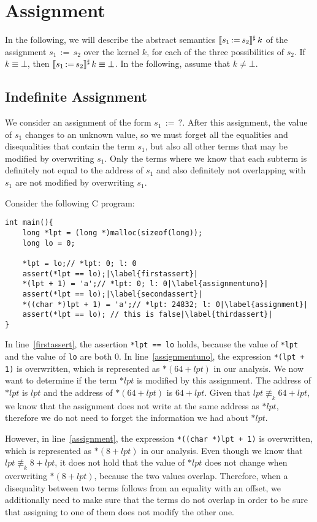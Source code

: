 \section{Assignment}

In the following, we will describe the abstract semantics $\llbracket s_1\,{:=}\,s_2\rrbracket^\sharp\,k$ of the assignment $s_1\,{:=}\,s_2$ over the kernel $k$, for each of the three possibilities of $s_2$.
If $k \equiv \bot$, then $\llbracket s_1\,{:=}\,s_2\rrbracket^\sharp\,k \equiv \bot$.
In the following, assume that $k \neq \bot$.

\subsection{Indefinite Assignment}

We consider an assignment of the form $s_1\,{:=}\,?$.
After this assignment, the value of $s_1$ changes to an unknown value,
so we must forget all the equalities and disequalities that contain the term $s_1$,
but also all other terms that may be modified by overwriting $s_1$.
Only the terms where we know that each subterm is definitely not equal to the address of $s_1$ and also definitely not overlapping with $s_1$ are not modified by overwriting $s_1$.

\begin{example}
	Consider the following C program:
\begin{verbatim}
int main(){
	long *lpt = (long *)malloc(sizeof(long));
	long lo = 0;

	*lpt = lo;// *lpt: 0; l: 0
	assert(*lpt == lo);|\label{firstassert}|
	*(lpt + 1) = 'a';// *lpt: 0; l: 0|\label{assignmentuno}|
	assert(*lpt == lo);|\label{secondassert}|
	*((char *)lpt + 1) = 'a';// *lpt: 24832; l: 0|\label{assignment}|
	assert(*lpt == lo); // this is false|\label{thirdassert}|
}
\end{verbatim}
In line~\ref{firstassert}, the assertion \texttt{*lpt == lo} holds, because the value of \texttt{*lpt} and the value of \texttt{lo} are both 0.
In line~\ref{assignmentuno}, the expression \texttt{*(lpt + 1)} is overwritten, which is represented as $*(64 + lpt)$ in our analysis.
We now want to determine if the term $*lpt$ is modified by this assignment.
The address of $*lpt$ is $lpt$ and the address of $*(64 + lpt)$ is $64 + lpt$.
Given that $lpt \nequiv_{k} 64 + lpt$, we know that the assignment does not write at the same address as $*lpt$, therefore we do not need to forget the information we had about $*lpt$.

However, in line~\ref{assignment}, the expression \texttt{*((char *)lpt + 1)} is overwritten, which is represented as $*(8 + lpt)$ in our analysis.
Even though we know that $lpt \nequiv_{k} 8 + lpt$, it does not hold that the value of $*lpt$ does not change when overwriting $*(8 + lpt)$, because the two values overlap.
Therefore, when a disequality between two terms follows from an equality with an offset, we additionally need to make sure that the terms do not overlap in order to be sure that assigning to one of them does not modify the other one.
\end{example}

